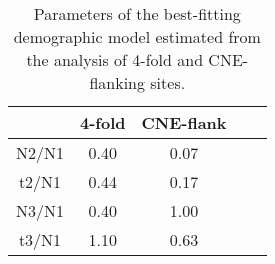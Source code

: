 \begin{table}[h!]
\centering
\caption[Parameters of the best-fitting demographic model estimated from the analysis of 4-fold and CNE-flanking sites]{Parameters of the best-fitting demographic model estimated from the analysis of 4-fold and CNE-flanking sites. }
 \begin{tabular}{c c c c c } 

\toprule
	&4-fold	&CNE-flank \\ \hline
N2/N1&	0.40&	0.07 \\
t2/N1&	0.44&	0.17 \\
N3/N1&	0.40&	1.00 \\
t3/N1&	1.10&	0.63 \\
\bottomrule

\end{tabular}
\label{tab:CS2}
\end{table}